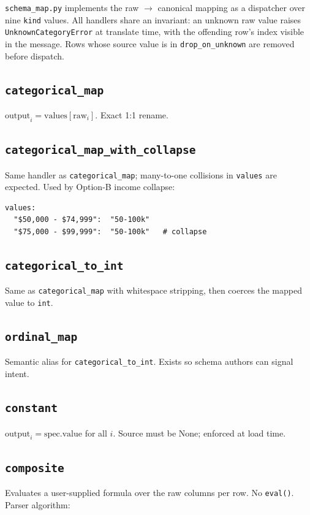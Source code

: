 \documentclass[11pt,a4paper]{article}
\begin{document}
\texttt{schema\_map.py} implements the raw $\to$ canonical mapping as a
dispatcher over nine \texttt{kind} values. All handlers share an
invariant: an unknown raw value raises
\texttt{UnknownCategoryError} at translate time, with the offending
row's index visible in the message. Rows whose source value is in
\texttt{drop\_on\_unknown} are removed before dispatch.

\subsection{\texttt{categorical\_map}}
$\text{output}_i = \text{values}[\text{raw}_i]$. Exact 1:1 rename.

\subsection{\texttt{categorical\_map\_with\_collapse}}
Same handler as \texttt{categorical\_map}; many-to-one collisions in
\texttt{values} are expected. Used by Option-B income collapse:
\begin{lstlisting}
values:
  "$50,000 - $74,999":  "50-100k"
  "$75,000 - $99,999":  "50-100k"   # collapse
\end{lstlisting}

\subsection{\texttt{categorical\_to\_int}}
Same as \texttt{categorical\_map} with whitespace stripping, then
coerces the mapped value to \texttt{int}.

\subsection{\texttt{ordinal\_map}}
Semantic alias for \texttt{categorical\_to\_int}. Exists so schema
authors can signal intent.

\subsection{\texttt{constant}}
$\text{output}_i = \text{spec.value}$ for all $i$. Source must be None;
enforced at load time.

\subsection{\texttt{composite}}

Evaluates a user-supplied formula over the raw columns per row. No
\texttt{eval()}. Parser algorithm:
\end{document}
